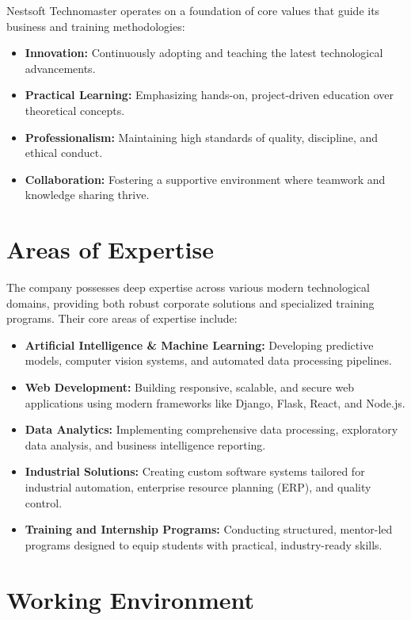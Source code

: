 Nestsoft Technomaster operates on a foundation of core values that guide its business and training methodologies:
\begin{itemize}[leftmargin=1.5cm]
    \item \textbf{Innovation:} Continuously adopting and teaching the latest technological advancements.
    \item \textbf{Practical Learning:} Emphasizing hands-on, project-driven education over theoretical concepts.
    \item \textbf{Professionalism:} Maintaining high standards of quality, discipline, and ethical conduct.
    \item \textbf{Collaboration:} Fostering a supportive environment where teamwork and knowledge sharing thrive.
\end{itemize}

\section{Areas of Expertise}

The company possesses deep expertise across various modern technological domains, providing both robust corporate solutions and specialized training programs. Their core areas of expertise include:
\begin{itemize}[leftmargin=1.5cm]
    \item \textbf{Artificial Intelligence \& Machine Learning:} Developing predictive models, computer vision systems, and automated data processing pipelines.
    \item \textbf{Web Development:} Building responsive, scalable, and secure web applications using modern frameworks like Django, Flask, React, and Node.js.
    \item \textbf{Data Analytics:} Implementing comprehensive data processing, exploratory data analysis, and business intelligence reporting.
    \item \textbf{Industrial Solutions:} Creating custom software systems tailored for industrial automation, enterprise resource planning (ERP), and quality control.
    \item \textbf{Training and Internship Programs:} Conducting structured, mentor-led programs designed to equip students with practical, industry-ready skills.
\end{itemize}

\section{Working Environment}

